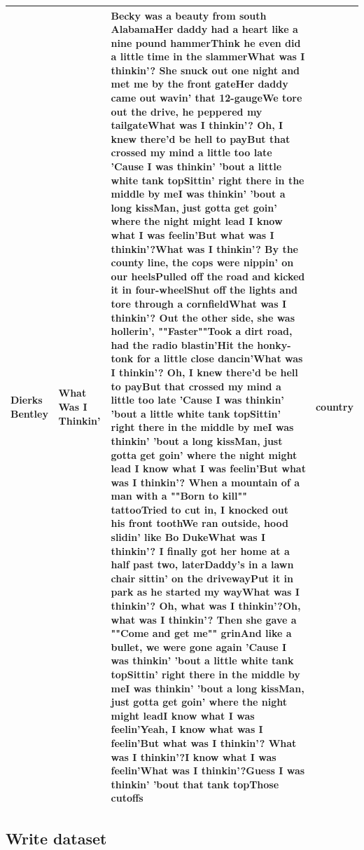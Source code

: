 \documentclass[
  letterpaper,
]{latex/krantz}
\begin{document}
\begin{table}
\begin{tabular}{llll}
Dierks Bentley & What Was I Thinkin' & Becky was a beauty from south AlabamaHer daddy had a heart like a nine pound hammerThink he even did a little time in the slammerWhat was I thinkin'? She snuck out one night and met me by the front gateHer daddy came out wavin' that 12-gaugeWe tore out the drive, he peppered my tailgateWhat was I thinkin'? Oh, I knew there'd be hell to payBut that crossed my mind a little too late 'Cause I was thinkin' 'bout a little white tank topSittin' right there in the middle by meI was thinkin' 'bout a long kissMan, just gotta get goin' where the night might lead I know what I was feelin'But what was I thinkin'?What was I thinkin'? By the county line, the cops were nippin' on our heelsPulled off the road and kicked it in four-wheelShut off the lights and tore through a cornfieldWhat was I thinkin'? Out the other side, she was hollerin', ""Faster""Took a dirt road, had the radio blastin'Hit the honky-tonk for a little close dancin'What was I thinkin'? Oh, I knew there'd be hell to payBut that crossed my mind a little too late 'Cause I was thinkin' 'bout a little white tank topSittin' right there in the middle by meI was thinkin' 'bout a long kissMan, just gotta get goin' where the night might lead I know what I was feelin'But what was I thinkin'? When a mountain of a man with a ""Born to kill"" tattooTried to cut in, I knocked out his front toothWe ran outside, hood slidin' like Bo DukeWhat was I thinkin'? I finally got her home at a half past two, laterDaddy's in a lawn chair sittin' on the drivewayPut it in park as he started my wayWhat was I thinkin'? Oh, what was I thinkin'?Oh, what was I thinkin'? Then she gave a ""Come and get me"" grinAnd like a bullet, we were gone again 'Cause I was thinkin' 'bout a little white tank topSittin' right there in the middle by meI was thinkin' 'bout a long kissMan, just gotta get goin' where the night might leadI know what I was feelin'Yeah, I know what was I feelin'But what was I thinkin'? What was I thinkin'?I know what I was feelin'What was I thinkin'?Guess I was thinkin' 'bout that tank topThose cutoffs & country\\
\bottomrule
\end{tabular}
\end{table}

\hypertarget{write-dataset-1}{%
\subsection{Write dataset}\label{write-dataset-1}}
\end{document}
